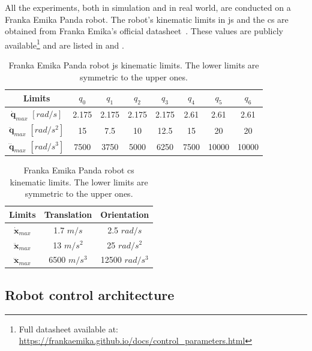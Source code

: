 All the experiments, both in simulation and in real world, are conducted on a Franka Emika Panda robot. The robot's kinematic limits in \gls{js} and the \gls{cs} are obtained from Franka Emika's official datasheet~\cite{frankadata}.  These values are publicly available\footnote{\label{note:topca_franka}Full datasheet available at: \url{https://frankaemika.github.io/docs/control_parameters.html}} and are listed in  and .

\begin{table}[h!]
    \centering
    \begin{tabular}{|c|ccccccc|}
        \hline
        Limits & $q_0$ & $q_1$ & $q_2$ & $q_3$ & $q_4$ & $q_5$ & $q_6$ \\
        \hline
        $\dot{\bm{q}}_{max}$ $[{rad}/{s}]$ & 2.175 & 2.175 & 2.175 & 2.175 & 2.61 & 2.61 & 2.61 \\
        $\ddot{\bm{q}}_{max}$ $[{rad}/{s}^2]$ & 15 & 7.5 & 10 & 12.5 & 15 & 20 & 20 \\
        $\dddot{\bm{q}}_{max}$ $[{rad}/{s}^3]$ & 7500 & 3750 & 5000 & 6250 & 7500 & 10000 & 10000 \\
        \hline
    \end{tabular}
    \caption{Franka Emika Panda robot \gls{js} kinematic limits. The lower limits are symmetric to the upper ones.}
    \label{tab:panda_limits_js}
\end{table}

	
\begin{table}[h]
    \centering
    \begin{tabular}{|c|cc|}
        \hline
        Limits & Translation & Orientation \\
        \hline
        $\dot{\bm{x}}_{max}$ & 1.7 $m/s$ & 2.5 $rad/s$ \\
        $\ddot{\bm{x}}_{max}$ & 13 $m/s^2$ & 25 $rad/s^{2}$\\
        $\dddot{\bm{x}}_{max}$ & 6500 $m/s^3$ & 12500 $rad/s^{3}$\\
        \hline
    \end{tabular}
    \caption{Franka Emika Panda robot \gls{cs} kinematic limits. The lower limits are symmetric to the upper ones.}
    \label{tab:franka_limits}
\end{table}


\subsection{Robot control architecture}
\label{ch:qp}

